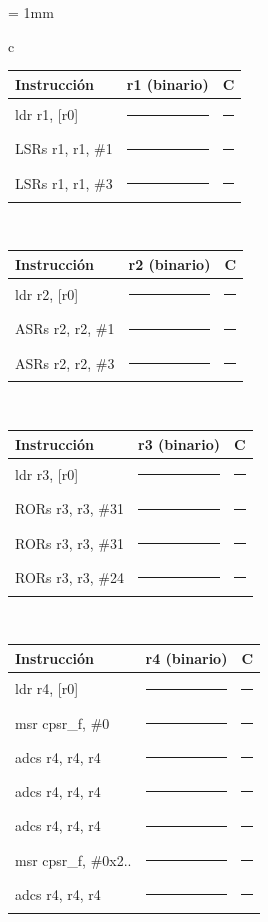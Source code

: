 \begin{center}
\small
\colorbox[gray]{0.9}{
\tabcolsep = 1mm
\begin{tabular}{c}
\colorbox[gray]{1}{
\begin{tabular}{|p{3cm}||c|c|}
\hline
Instrucción & r1 (binario) & C \\
\hline\hline
ldr r1, [r0]&\rule{6cm}{0cm}&\rule{1cm}{0cm}\\
\hline
LSRs r1, r1, \#1&\rule{6cm}{0cm}&\rule{1cm}{0cm}\\
\hline
LSRs r1, r1, \#3&\rule{6cm}{0cm}&\rule{1cm}{0cm}\\
\hline
\end{tabular}
}
\\[1mm]
\colorbox[gray]{1}{
\begin{tabular}{|p{3cm}||c|c|}
\hline
Instrucción & r2 (binario) & C \\
\hline\hline
ldr r2, [r0]&\rule{6cm}{0cm}&\rule{1cm}{0cm}\\
\hline
ASRs r2, r2, \#1&\rule{6cm}{0cm}&\rule{1cm}{0cm}\\
\hline
ASRs r2, r2, \#3&\rule{6cm}{0cm}&\rule{1cm}{0cm}\\
\hline
\end{tabular}
}
\\[1mm]
\colorbox[gray]{1}{
\begin{tabular}{|p{3cm}||c|c|}
\hline
Instrucción & r3 (binario) & C \\
\hline\hline
ldr r3, [r0]&\rule{6cm}{0cm}&\rule{1cm}{0cm}\\
\hline
RORs r3, r3, \#31&\rule{6cm}{0cm}&\rule{1cm}{0cm}\\
\hline
RORs r3, r3, \#31&\rule{6cm}{0cm}&\rule{1cm}{0cm}\\
\hline
RORs r3, r3, \#24&\rule{6cm}{0cm}&\rule{1cm}{0cm}\\
\hline
\end{tabular}
}
\\[1mm]
\colorbox[gray]{1}{
\begin{tabular}{|p{3.2cm}||c|c|}
\hline
Instrucción & r4 (binario) & C \\
\hline\hline
ldr r4, [r0]&\rule{6cm}{0cm}&\rule{1cm}{0cm}\\
\hline
msr cpsr\_f, \#0&\rule{6cm}{0cm}&\rule{1cm}{0cm}\\
\hline
adcs r4, r4, r4&\rule{6cm}{0cm}&\rule{1cm}{0cm}\\
\hline
adcs r4, r4, r4&\rule{6cm}{0cm}&\rule{1cm}{0cm}\\
\hline
adcs r4, r4, r4&\rule{6cm}{0cm}&\rule{1cm}{0cm}\\
\hline
msr cpsr\_f, \#0x2..&\rule{6cm}{0cm}&\rule{1cm}{0cm}\\
\hline
adcs r4, r4, r4&\rule{6cm}{0cm}&\rule{1cm}{0cm}\\
\hline 
\end{tabular}
}
\\[1mm]
\end{tabular}
}
\end{center}

